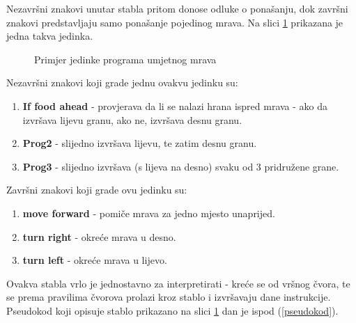  Nezavršni znakovi unutar stabla pritom donose odluke o ponašanju, dok završni znakovi predstavljaju samo ponašanje pojedinog mrava. Na slici \ref{ant} prikazana je jedna takva jedinka. 

\begin{figure}
	\centering


	\caption{Primjer jedinke programa umjetnog mrava}
	\label{ant}
\end{figure}


Nezavršni znakovi koji grade jednu ovakvu jedinku su:

\begin{enumerate}

  \item \textbf{If food ahead} - provjerava da li se nalazi hrana ispred mrava - ako da izvršava lijevu granu, ako ne, izvršava desnu granu.
  \item \textbf{Prog2} - slijedno izvršava lijevu, te zatim desnu granu.
  \item \textbf{Prog3} - slijedno izvršava (s lijeva na desno) svaku od 3 pridružene grane.

\end{enumerate}

Završni znakovi koji grade ovu jedinku su:
\begin{enumerate}

  \item \textbf{move forward} - pomiče mrava za jedno mjesto unaprijed.
  \item \textbf{turn right} - okreće mrava u desno.
  \item \textbf{turn left} - okreće mrava u lijevo.

\end{enumerate}

Ovakva stabla vrlo je jednostavno za interpretirati - kreće se od vršnog čvora, te se prema pravilima čvorova prolazi kroz stablo i izvršavaju dane instrukcije. Pseudokod koji opisuje stablo prikazano na slici \ref{ant} dan je ispod (\ref{pseudokod}).


